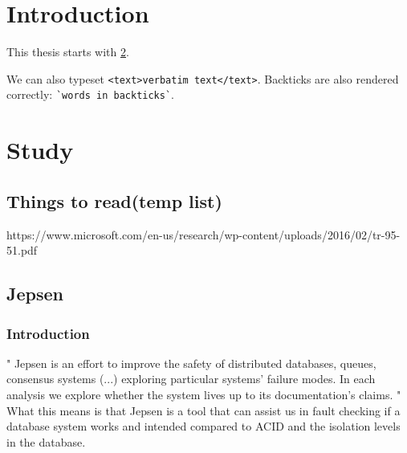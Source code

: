 \documentclass[
  a4paper,  %
  twoside,  %
  bibliography=totoc,
  headsepline,
  cleardoublepage=empty,
  parskip=half,
  draft=false
]{scrbook}
\begin{document}


\renewcommand*{\chapterpagestyle}{scrplain}
\pagestyle{scrheadings}
\pagestyle{scrheadings}
\ihead[]{}
\chead[]{}
\ohead[]{\headmark}
\cfoot[]{}
\ifoot[]{}






%
%


\chapter{Introduction}

This thesis starts with \cref{chap:k2}.

We can also typeset \verb|<text>verbatim text</text>|.
Backticks are also rendered correctly: \verb|`words in backticks`|.

\chapter{Study}
\label{chap:k2}

\section{Things to read(temp list)}

https://www.microsoft.com/en-us/research/wp-content/uploads/2016/02/tr-95-51.pdf


\section{Jepsen}
\subsection{Introduction}
"
Jepsen is an effort to improve the safety of distributed databases, queues, consensus systems  (...) exploring particular systems’ failure modes. In each analysis we explore whether the system lives up to its documentation’s claims.
"\cite{jepsonio}
\\
What this means is that Jepsen is a tool that can assist us in fault checking if a database system works and intended compared to ACID and the isolation levels in the database.
\end{document}
